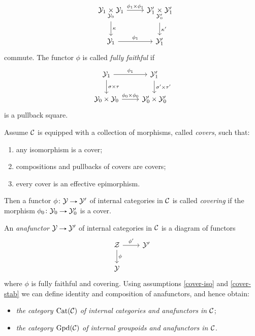 \begin{appendices}
\begin{definitions}
\[    \quad
    \begin{tikzcd}
      \Y_1 \underset{\Y_0}{\times} \Y_1 \ar[r, "\phi_1 \times \phi_1"]
      \ar[d,
      "\kappa"] & \Y'_1 \underset{\Y'_0}{\times} \Y'_1 \ar[d, "\kappa'"] \\
      \Y_1 \ar[r, "\phi_1"] & \Y'_1
    \end{tikzcd}
    \]
    commute. The functor $\phi$ is called \emph{fully faithful} if
    \[
    \begin{tikzcd}
      \Y_1 \ar[r, "\phi_1"] \ar[d, "\sigma \times \tau"] & \Y'_1
      \ar[d, "\sigma' \times \tau'"] \\ \Y_0 \times \Y_0 \ar[r, "\phi_0
      \times \phi_0"] & \Y'_0 \times \Y'_0
    \end{tikzcd}
    \]
    is a pullback square.
  \end{definitions}

  \begin{definitions}
    \label{anafunctor}
    Assume $\mathcal{C}$ is equipped with a collection of morphisms, called
    \emph{covers}, such that:
    \begin{enumerate}
    \item \label{cover-iso} any isomorphism is a cover;
    \item \label{cover-stab} compositions and pullbacks of covers are
      covers;
    \item \label{cover-eff} every cover is an effective epimorphism.
    \end{enumerate}
    Then a functor $\phi \c \Y \to \Y'$ of internal categories in $\mathcal{C}$
    is called \emph{covering} if the morphism $\phi_0 \c \Y_0 \to
    \Y'_0$ is a cover.

    An \emph{anafunctor} $\Y \to \Y'$ of internal categories in $\mathcal{C}$
    is a diagram of functors
    \[
    \begin{tikzcd}
      \Z \ar[r, "\phi'"] \ar[d, "\phi"] & \Y' \\ \Y &
    \end{tikzcd}
    \]
    where $\phi$ is fully faithful and covering. Using assumptions
    \cref{cover-iso} and \cref{cover-stab} we can define identity and
    composition of anafunctors, and hence obtain:
    \begin{itemize}
    \item \emph{the category $\operatorname{Cat}(\mathcal{C})$ of internal categories and
        anafunctors in $\mathcal{C}$};
    \item \emph{the category $\operatorname{Gpd}(\mathcal{C})$ of internal groupoids and
        anafunctors in $\mathcal{C}$}.
    \end{itemize}


\end{definitions}
\end{appendices}

